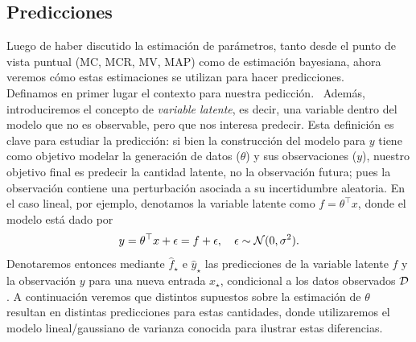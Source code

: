\subsection{Predicciones}
\label{sub:predicciones}

Luego de haber discutido la estimación de parámetros, tanto desde el punto de vista puntual (MC, MCR, MV, MAP) como de estimación bayesiana, ahora veremos cómo estas estimaciones se utilizan para hacer predicciones. \\

Definamos en primer lugar el contexto para nuestra pedicción. \ Además, introduciremos el concepto de \emph{variable latente}, es decir, una variable dentro del modelo que no es observable, pero que nos interesa predecir. Esta definición es clave para estudiar la predicción: si bien la construcción del modelo para $y$ tiene como objetivo modelar la generación de datos ($\theta$) y sus observaciones ($y$), nuestro objetivo final es predecir la cantidad latente, no la observación futura;  pues la observación contiene una perturbación asociada a su incertidumbre aleatoria. En el caso lineal, por ejemplo, denotamos la variable latente como $f = \theta^\top x$, donde el modelo está dado por
\begin{equation}
		 y = \theta^\top x  + \epsilon = f + \epsilon, \quad \epsilon \sim {\mathcal N}(0,\sigma^2).
\end{equation}
Denotaremos entonces mediante $\hat f_\star$ e $\hat y_\star$ las predicciones de la variable latente $f$ y la observación $y$ para una nueva entrada $x_\star$, condicional a los datos observados ${\mathcal D}$. A continuación veremos que distintos supuestos sobre la estimación de $\theta$ resultan en distintas predicciones para estas cantidades, donde utilizaremos el modelo lineal/gaussiano de varianza conocida para ilustrar estas diferencias. 

